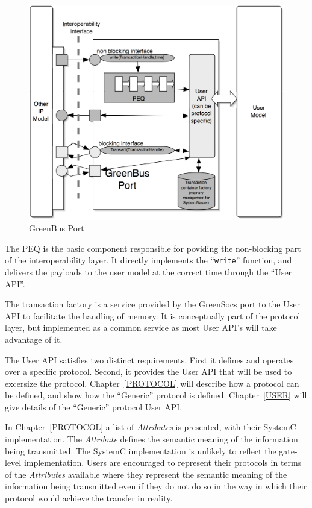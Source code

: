 \documentclass[12pt,oneside]{gsbook}
\newcommand{\quark}{{\em Attribute}\xspace}
\newcommand{\quarks}{{\em Attributes}\xspace}
\begin{document}
\begin{figure}[htbp]
        \centering
        \includegraphics[scale=0.75]{GreenBusPort.eps}
        \caption{GreenBus Port}
        \label{fig:greenbusport}
\end{figure}

The PEQ is the basic component responsible for poviding the
non-blocking part of the interoperability layer. It directly
implements the ``{\tt write}'' function, and delivers the payloads to
the user model at the correct time through the ``User API''.

The transaction factory is a service provided by the GreenSocs port to
the User API to facilitate the handling of memory. It is conceptually
part of the protocol layer, but implemented as a common service as
most User API's will take advantage of it.

The User API satisfies two distinct requirements, First it defines
and operates over a specific protocol. Second, it provides the User
API that will be used to excersize the protocol.
Chapter~\ref{PROTOCOL} will describe how a protocol can be defined,
and show how the ``Generic'' protocol is defined.
Chapter~\ref{USER} will give details of the ``Generic'' protocol User API.


In Chapter~\ref{PROTOCOL}  
a list of \quarks is presented, with their SystemC implementation. The \quark
defines the semantic meaning of the information being transmitted. The SystemC
implementation is unlikely to reflect the gate-level implementation. Users are
encouraged to represent their protocols in terms of the \quarks available where
they represent the semantic meaning of the information being transmitted even if
they do not do so in the way in which their protocol would achieve the transfer
in reality.
\end{document}
